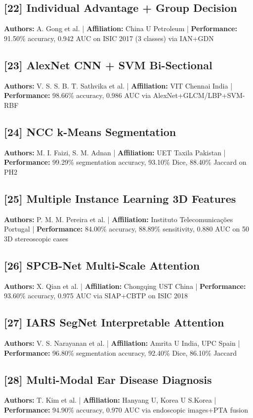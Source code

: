 \documentclass[10pt,twocolumn]{article}
\begin{document}
\subsection*{[22] Individual Advantage + Group Decision}
\textbf{Authors:} A. Gong et al. | \textbf{Affiliation:} China U Petroleum | \textbf{Performance:} 91.50\% accuracy, 0.942 AUC on ISIC 2017 (3 classes) via IAN+GDN

\subsection*{[23] AlexNet CNN + SVM Bi-Sectional}
\textbf{Authors:} V. S. S. B. T. Sathvika et al. | \textbf{Affiliation:} VIT Chennai India | \textbf{Performance:} 98.66\% accuracy, 0.986 AUC via AlexNet+GLCM/LBP+SVM-RBF

\subsection*{[24] NCC k-Means Segmentation}
\textbf{Authors:} M. I. Faizi, S. M. Adnan | \textbf{Affiliation:} UET Taxila Pakistan | \textbf{Performance:} 99.29\% segmentation accuracy, 93.10\% Dice, 88.40\% Jaccard on PH2

\subsection*{[25] Multiple Instance Learning 3D Features}
\textbf{Authors:} P. M. M. Pereira et al. | \textbf{Affiliation:} Instituto Telecomunicações Portugal | \textbf{Performance:} 84.00\% accuracy, 88.89\% sensitivity, 0.880 AUC on 50 3D stereoscopic cases

\subsection*{[26] SPCB-Net Multi-Scale Attention}
\textbf{Authors:} X. Qian et al. | \textbf{Affiliation:} Chongqing UST China | \textbf{Performance:} 93.60\% accuracy, 0.975 AUC via SIAP+CBTP on ISIC 2018

\subsection*{[27] IARS SegNet Interpretable Attention}
\textbf{Authors:} V. S. Narayanan et al. | \textbf{Affiliation:} Amrita U India, UPC Spain | \textbf{Performance:} 96.80\% segmentation accuracy, 92.40\% Dice, 86.10\% Jaccard

\subsection*{[28] Multi-Modal Ear Disease Diagnosis}
\textbf{Authors:} T. Kim et al. | \textbf{Affiliation:} Hanyang U, Korea U S.Korea | \textbf{Performance:} 94.90\% accuracy, 0.970 AUC via endoscopic images+PTA fusion
\end{document}

